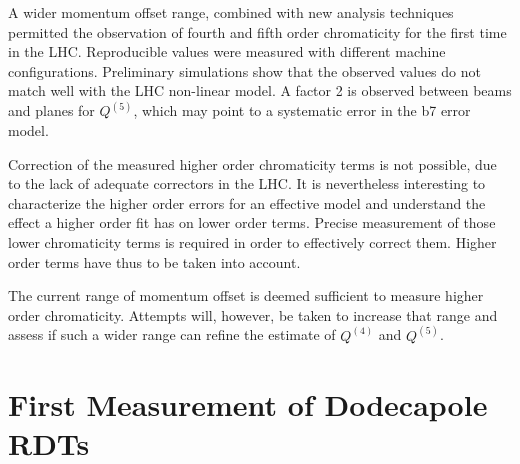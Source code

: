 A wider momentum offset range, combined with new analysis techniques permitted the observation of fourth and fifth order chromaticity for the first time in the LHC. Reproducible values were measured with different machine configurations.
Preliminary simulations show that the observed values do not match well with the LHC non-linear model. A factor 2 is observed between beams and planes for $Q^{(5)}$, which may point to a systematic error in the b7 error model.

Correction of the measured higher order chromaticity terms is not possible, due to the lack of adequate
correctors in the LHC. It is nevertheless interesting to characterize the higher order errors for an effective model and understand the effect a higher order fit has on lower order terms.
Precise measurement of those lower chromaticity terms is required in order to effectively correct them. 
Higher order terms have thus to be taken into account.

The current range of momentum offset is deemed sufficient to measure higher order chromaticity. Attempts will, however,
be taken to increase that range and assess if such a wider range can refine the estimate of $Q^{(4)}$ and
$Q^{(5)}$.


\section{First Measurement of Dodecapole RDTs}